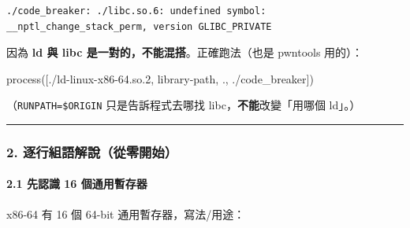 \documentclass[10pt,a4paper]{article}
\newenvironment{Shaded}{\begin{snugshade}}{\end{snugshade}}
\newcommand{\NormalTok}[1]{#1}
\newcommand{\StringTok}[1]{\textcolor[rgb]{0.31,0.60,0.02}{#1}}
\renewenvironment{Shaded}{%
  \def\FrameCommand{\fboxsep=3.2pt\colorbox{shadecolor}}%
  \MakeFramed{\advance\hsize-\width\FrameRestore\small}%
}{%
  \endMakeFramed
}
\begin{document}
\begin{Verbatim}[breaklines=true,breakanywhere=true,breakautoindent=false,fontsize=\fontsize{7.0}{9.5}\selectfont]
./code_breaker: ./libc.so.6: undefined symbol: __nptl_change_stack_perm, version GLIBC_PRIVATE
\end{Verbatim}

因為 \textbf{ld 與 libc 是一對的，不能混搭}。正確跑法（也是 pwntools
用的）：

\begin{Shaded}
\begin{Highlighting}[]
\NormalTok{process([}\StringTok{\textquotesingle{}./ld{-}linux{-}x86{-}64.so.2\textquotesingle{}}\NormalTok{, }\StringTok{\textquotesingle{}{-}{-}library{-}path\textquotesingle{}}\NormalTok{, }\StringTok{\textquotesingle{}.\textquotesingle{}}\NormalTok{, }\StringTok{\textquotesingle{}./code\_breaker\textquotesingle{}}\NormalTok{])}
\end{Highlighting}
\end{Shaded}

（\texttt{RUNPATH=\$\allowbreak{}ORIGIN} 只是告訴程式去哪找
libc，\textbf{不能}改變「用哪個 ld」。）

\begin{center}\rule{0.5\linewidth}{0.5pt}\end{center}

\subsubsection{2.
逐行組語解說（從零開始）}\label{ux9010ux884cux7d44ux8a9eux89e3ux8aaaux5f9eux96f6ux958bux59cb}

\paragraph{2.1 先認識 16
個通用暫存器}\label{ux5148ux8a8dux8b58-16-ux500bux901aux7528ux66abux5b58ux5668}

x86-64 有 16 個 64-bit 通用暫存器，寫法/用途：
\end{document}
